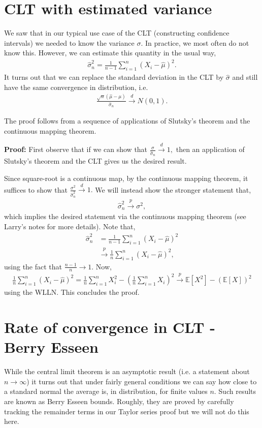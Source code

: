 \documentclass[twoside,12pt]{article}
\newcommand{\cdist}{\overset{d}{\rightarrow}}
\newcommand{\cprob}{\overset{p}{\rightarrow}}
\begin{document}
\section{CLT with estimated variance}
We saw that in our typical use case of the CLT (constructing confidence intervals) we needed to know the variance $\sigma$. In practice, we most often do not know this. However, we can estimate this quantity in the usual way,
\begin{align*}
\widehat{\sigma}^2_n = \frac{1}{n-1} \sum_{i=1}^n (X_i - \widehat{\mu})^2.
\end{align*}
It turns out that we can replace the standard deviation in the CLT by $\widehat{\sigma}$ and still have the same convergence in distribution, i.e.
\begin{align*}
\frac{\sqrt{n}(\widehat{\mu}- \mu)}{\widehat{\sigma}_n} \cdist N(0,1).
\end{align*}

The proof follows from a sequence of applications of Slutsky's theorem and the continuous mapping theorem.

{\bf Proof: } First observe that if we can show that $\frac{\sigma}{\widehat{\sigma}_n} \cdist 1,$ then an application of Slutsky's theorem and the CLT gives us the desired result.

Since square-root is a continuous map, by the continuous mapping theorem, it suffices to show that $\frac{\sigma^2}{\widehat{\sigma}_n^2} \cdist 1.$ We will instead show the stronger statement that,
\begin{align*}
\widehat{\sigma}_n^2 \cprob \sigma^2,
\end{align*}
which implies the desired statement via the continuous mapping theorem (see Larry's notes for more details). Note that,
\begin{align*}
\widehat{\sigma}_n^2 &= \frac{1}{n-1} \sum_{i=1}^n (X_i - \widehat{\mu})^2 \\
&\cprob \frac{1}{n}  \sum_{i=1}^n (X_i - \widehat{\mu})^2, %
\end{align*}
using the fact that $\frac{n-1}{n} \rightarrow 1$. Now,
\begin{align*}
\frac{1}{n}  \sum_{i=1}^n (X_i - \widehat{\mu})^2 = \frac{1}{n} \sum_{i=1}^n X_i^2 - \left(\frac{1}{n} \sum_{i=1}^n X_i \right)^2 \cprob \mathbb{E}[X^2] - (\mathbb{E}[X])^2
\end{align*}
using the WLLN. This concludes the proof.


\section{Rate of convergence in CLT - Berry Esseen}
While the central limit theorem is an asymptotic result (i.e. a statement about $n \rightarrow \infty$) it turns out that under fairly general conditions we can say how close to a standard normal the average is, in distribution, for finite values $n$. Such results are known as Berry Esseen bounds. Roughly, they are proved by carefully tracking the remainder terms in our Taylor series proof but we will not do this here.
\end{document}
